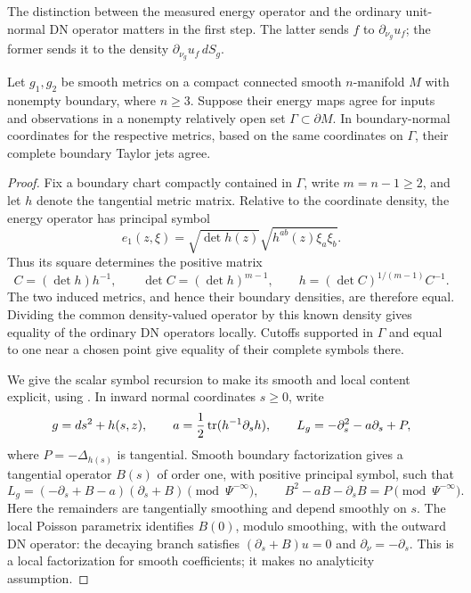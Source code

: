 The distinction between the measured energy operator and the ordinary
unit-normal DN operator matters in the first step. The latter sends
$f$ to $\partial_{\nu_g}u_f$; the former sends it to the density
$\partial_{\nu_g}u_f\,dS_g$.

\begin{lemma}\label{data:jets}
Let $g_1,g_2$ be smooth metrics on a compact connected smooth
$n$-manifold $M$ with nonempty boundary, where $n\ge3$. Suppose their
energy maps agree for inputs and observations in a nonempty relatively
open set $\Gamma\subset\partial M$. In boundary-normal coordinates
for the respective metrics, based on the same coordinates on
$\Gamma$, their complete boundary Taylor jets agree.
\end{lemma}

\begin{proof}
Fix a boundary chart compactly contained in $\Gamma$, write
$m=n-1\ge2$, and let $h$ denote the tangential metric matrix.
Relative to the coordinate density, the energy operator has principal
symbol
\[
 e_1(z,\xi)=\sqrt{\det h(z)}
             \sqrt{h^{ab}(z)\xi_a\xi_b}.
\]
Thus its square determines the positive matrix
\[
 C=(\det h)h^{-1},\qquad
 \det C=(\det h)^{m-1},\qquad
 h=(\det C)^{1/(m-1)}C^{-1}.
\]
The two induced metrics, and hence their boundary densities, are
therefore equal. Dividing the common density-valued operator by this
known density gives equality of the ordinary DN operators locally.
Cutoffs supported in $\Gamma$ and equal to one near a chosen point
give equality of their complete symbols there.

We give the scalar symbol recursion to make its smooth and local
content explicit, using \citet[Theorem~1.1(ii) and
Proposition~3.1]{JoshiLionheart2005}.
In inward normal coordinates $s\ge0$, write
\[
 g=ds^2+h(s,z),\qquad
 a=\frac12\operatorname{tr}(h^{-1}\partial_s h),\qquad
 L_g=-\partial_s^2-a\partial_s+P,
\]
where $P=-\Delta_{h(s)}$ is tangential. Smooth boundary factorization
gives a tangential operator $B(s)$ of order one, with positive
principal symbol, such that
\begin{equation}\label{data:factorization}
 L_g=(-\partial_s+B-a)(\partial_s+B)
          \pmod{\Psi^{-\infty}},\qquad
 B^2-aB-\partial_sB=P\pmod{\Psi^{-\infty}}.
\end{equation}
Here the remainders are tangentially smoothing and depend smoothly on
$s$. The local Poisson parametrix identifies $B(0)$, modulo smoothing,
with the outward DN operator: the decaying branch satisfies
$(\partial_s+B)u=0$ and $\partial_\nu=-\partial_s$.
This is a local factorization for smooth coefficients; it makes no
analyticity assumption.


\end{proof}
